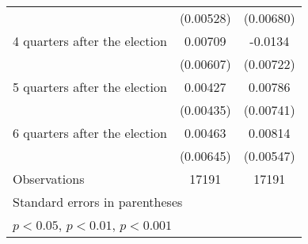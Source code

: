 \begin{table}[htbp]
\begin{tabular}{l*{2}{c}}
                    &   (0.00528)         &   (0.00680)         \\
[1em]
 4 quarters after the election&     0.00709         &     -0.0134         \\
                    &   (0.00607)         &   (0.00722)         \\
[1em]
 5 quarters after the election&     0.00427         &     0.00786         \\
                    &   (0.00435)         &   (0.00741)         \\
[1em]
 6 quarters after the election&     0.00463         &     0.00814         \\
                    &   (0.00645)         &   (0.00547)         \\
\hline
Observations        &       17191         &       17191         \\
\hline\hline
\multicolumn{3}{l}{\footnotesize Standard errors in parentheses}\\
\multicolumn{3}{l}{\footnotesize \sym{*} \(p<0.05\), \sym{**} \(p<0.01\), \sym{***} \(p<0.001\)}\\
\end{tabular}
\end{table}
